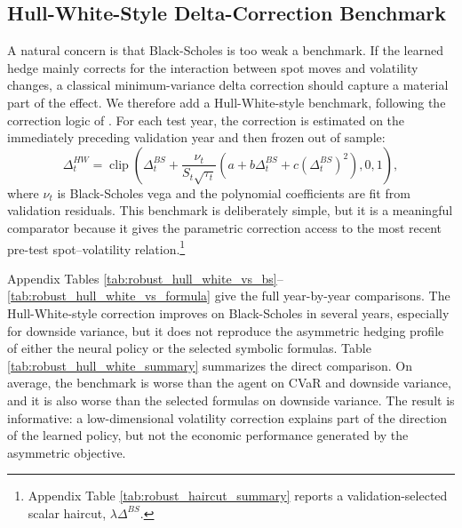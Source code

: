 \documentclass[a4paper,12pt]{article}
\numberwithin{equation}{section}
\begin{document}
\subsection{Hull-White-Style Delta-Correction Benchmark}
\label{sec:robust_hull_white}

A natural concern is that Black-Scholes is too weak a benchmark. If the learned hedge mainly corrects for the interaction between spot moves and volatility changes, a classical minimum-variance delta correction should capture a material part of the effect. We therefore add a Hull-White-style benchmark, following the correction logic of \citet{hull2017optimal}. For each test year, the correction is estimated on the immediately preceding validation year and then frozen out of sample:
\[
\Delta^{HW}_t =
\operatorname{clip}\left(
\Delta^{BS}_t
+ \frac{\nu_t}{S_t\sqrt{\tau_t}}
\left(a+b\Delta^{BS}_t+c(\Delta^{BS}_t)^2\right),
0,1
\right),
\]
where $\nu_t$ is Black-Scholes vega and the polynomial coefficients are fit from validation residuals. This benchmark is deliberately simple, but it is a meaningful comparator because it gives the parametric correction access to the most recent pre-test spot--volatility relation.\footnote{Appendix Table \ref{tab:robust_haircut_summary} reports a validation-selected scalar haircut, $\lambda\Delta^{BS}$.}

Appendix Tables \ref{tab:robust_hull_white_vs_bs}--\ref{tab:robust_hull_white_vs_formula} give the full year-by-year comparisons. The Hull-White-style correction improves on Black-Scholes in several years, especially for downside variance, but it does not reproduce the asymmetric hedging profile of either the neural policy or the selected symbolic formulas. Table \ref{tab:robust_hull_white_summary} summarizes the direct comparison. On average, the benchmark is worse than the agent on CVaR and downside variance, and it is also worse than the selected formulas on downside variance. The result is informative: a low-dimensional volatility correction explains part of the direction of the learned policy, but not the economic performance generated by the asymmetric objective.

\begin{table}[H]
    \centering
    \caption{Hull-White-style benchmark relative to the learned hedges. Entries are averages across test years. Reward and CVaR are left-minus-right differences; log downside variance and log variance are log ratios. Negative values are favorable for variance metrics. Parentheses report the number of significantly favorable/significantly unfavorable years at the 5\% level under the two-stage bootstrap.}
    \label{tab:robust_hull_white_summary}
    \small
    
\end{table}
\end{document}
